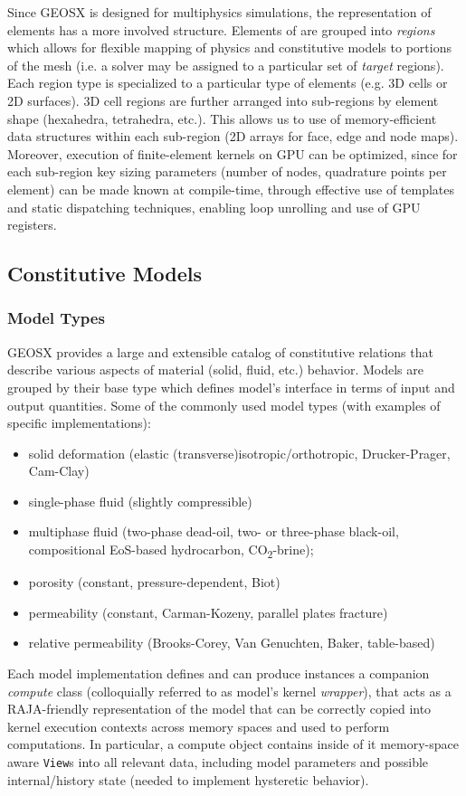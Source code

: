 Since GEOSX is designed for multiphysics simulations, the representation of elements has a more involved structure.   Elements of are grouped into \textit{regions} which allows for flexible mapping of physics and constitutive models to portions of the mesh (i.e. a solver may be assigned to a particular set of \textit{target} regions).   Each region type is specialized to a particular type of elements (e.g. 3D cells or 2D surfaces).   3D cell regions are further arranged into sub-regions by element shape (hexahedra, tetrahedra, etc.).    This allows us to use of memory-efficient data structures within each sub-region (2D arrays for face, edge and node maps).   Moreover, execution of finite-element kernels on GPU can be optimized, since for each sub-region key sizing parameters (number of nodes, quadrature points per element) can be made known at compile-time, through effective use of templates and static dispatching techniques, enabling loop unrolling and use of GPU registers.

\subsection{Constitutive Models}
\label{subsec:geosx_constitutive}

\subsubsection{Model Types}

GEOSX provides a large and extensible catalog of constitutive relations that describe various aspects of material (solid, fluid, etc.) behavior.   Models are grouped by their base type which defines model's interface in terms of input and output quantities.   Some of the commonly used model types (with examples of specific implementations):
\begin{itemize}
    \item solid deformation (elastic (transverse)isotropic/orthotropic, Drucker-Prager, Cam-Clay)
    \item single-phase fluid (slightly compressible)
    \item multiphase fluid (two-phase dead-oil, two- or three-phase black-oil, compositional EoS-based hydrocarbon, CO\textsubscript{2}-brine);
    \item porosity (constant, pressure-dependent, Biot)
    \item permeability (constant, Carman-Kozeny, parallel plates fracture)
    \item relative permeability (Brooks-Corey, Van Genuchten, Baker, table-based)
\end{itemize}
Each model implementation defines and can produce instances a companion \textit{compute} class (colloquially referred to as model's kernel \textit{wrapper}), that acts as a RAJA-friendly representation of the model that can be correctly copied into kernel execution contexts across memory spaces and used to perform computations.   In particular, a compute object contains inside of it memory-space aware \texttt{View}s into all relevant data, including model parameters and possible internal/history state (needed to implement hysteretic behavior).

